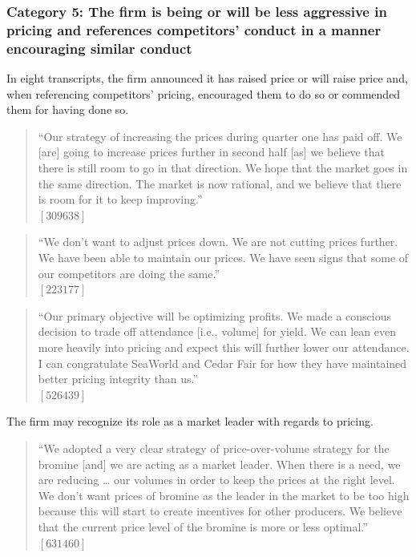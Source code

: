 \subsubsection{Category 5: The firm is being or will be less aggressive in pricing and references competitors’ conduct in a manner encouraging similar conduct}
In eight transcripts, the firm announced it has raised price or will raise price and, when referencing competitors’ pricing, encouraged them to do so or commended them for having done so.

\begin{quote}
``Our strategy of increasing the prices during quarter one has paid off. We [are] going to increase prices further in second half [as] we believe that there is still room to go in that direction. We hope that the market goes in the same direction. The market is now rational, and we believe that there is room for it to keep improving.'' \\
$[309638]$
\end{quote}

\begin{quote}
``We don't want to adjust prices down. We are not cutting prices further. We have been able to maintain our prices. We have seen signs that some of our competitors are doing the same.'' \\
$[223177]$
\end{quote}

\begin{quote}
``Our primary objective will be optimizing profits. We made a conscious decision to trade off attendance [i.e., volume] for yield. We can lean even more heavily into pricing and expect this will further lower our attendance. I can congratulate SeaWorld and Cedar Fair for how they have maintained better pricing integrity than us.'' \\
$[526439]$
\end{quote}

The firm may recognize its role as a market leader with regards to pricing.

\begin{quote}
``We adopted a very clear strategy of price-over-volume strategy for the bromine [and] we are acting as a market leader. When there is a need, we are reducing … our volumes in order to keep the prices at the right level. We don't want prices of bromine as the leader in the market to be too high because this will start to create incentives for other producers. We believe that the current price level of the bromine is more or less optimal.'' \\
$[631460]$
\end{quote}

